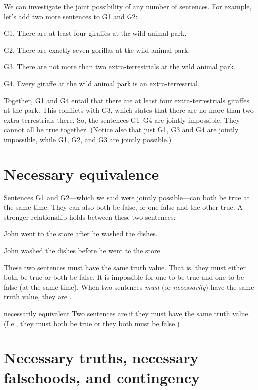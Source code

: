 We can investigate the joint possibility of any number of sentences. For example, let's add two more sentences to G1 and G2:
	\begin{ebullet}	
		\item[G1.] There are at least four giraffes at the wild animal park.
		\item[G2.] There are exactly seven gorillas at the wild animal park.
		\item[G3.] There are not more than two extra-terrestrials at the wild animal park.
		\item[G4.] Every giraffe at the wild animal park is an extra-terrestrial.
	\end{ebullet}
Together, G1 and G4 entail that there are at least four extra-terrestrials giraffes at the park. This conflicts with G3, which states that there are no more than two extra-terrestrials there. So, the sentences G1--G4 are jointly impossible. They cannot all be true together. (Notice also that just G1, G3 and G4 are jointly impossible, while G1, G2, and G3 are jointly possible.)


\section{Necessary equivalence}

Sentences G1 and G2---which we said were jointly possible---can both be true at the same time. They can also both be false, or one false and the other true. A stronger relationship holds between these two sentences:

\begin{earg}
\item[] John went to the store after he washed the dishes.
\item[] John washed the dishes before he went to the store.
\end{earg}
These two sentences must have the same truth value. That is, they must either both be true or both be false. It is impossible for one to be true and one to be false (at the same time).
When two sentences \textit{must} (or \textit{necessarily}) have the same truth value, they are .

\begin{factboxy}{necessarily equivalent}
Two sentences are  if they must have the same truth value. (I.e., they must both be true or they both must be false.)
\end{factboxy}


\section[Necessary truths, falsehoods, and contingency]{Necessary truths, necessary falsehoods, and contingency}\label{s:nec-truth}

